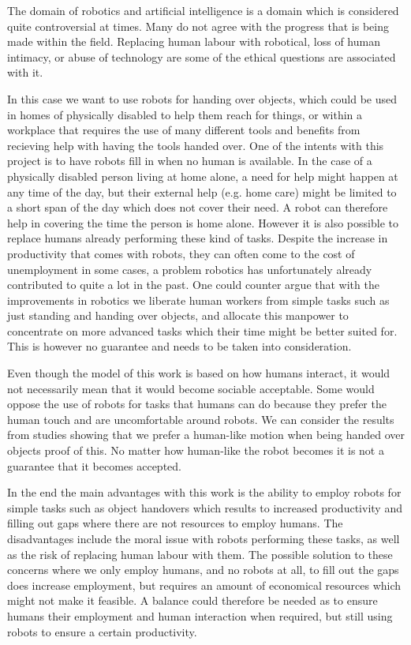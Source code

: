 The domain of robotics and artificial intelligence is a domain which is considered quite controversial at times. Many do not agree with the progress that is being made within the field. Replacing human labour with robotical, loss of human intimacy, or abuse of technology are some of the ethical questions are associated with it.

In this case we want to use robots for handing over objects, which could be used in homes of physically disabled to help them reach for things, or within a workplace that requires the use of many different tools and benefits from recieving help with having the tools handed over. One of the intents with this project is to have robots fill in when no human is available. In the case of a physically disabled person living at home alone, a need for help might happen at any time of the day, but their external help (e.g. home care) might be limited to a short span of the day which does not cover their need. A robot can therefore help in covering the time the person is home alone. However it is also possible to replace humans already performing these kind of tasks. Despite the increase in productivity that comes with robots, they can often come to the cost of unemployment in some cases, a problem robotics has unfortunately already contributed to quite a lot in the past. One could counter argue that with the improvements in robotics we liberate human workers from simple tasks such as just standing and handing over objects, and allocate this manpower to concentrate on more advanced tasks which their time might be better suited for. This is however no guarantee and needs to be taken into consideration.

Even though the model of this work is based on how humans interact, it would not necessarily mean that it would become sociable acceptable. Some would oppose the use of robots for tasks that humans can do because they prefer the human touch and are uncomfortable around robots. We can consider the results from studies showing that we prefer a human-like motion when being handed over objects proof of this. No matter how human-like the robot becomes it is not a guarantee that it becomes accepted.

In the end the main advantages with this work is the ability to employ robots for simple tasks such as object handovers which results to increased productivity and filling out gaps where there are not resources to employ humans. The disadvantages include the moral issue with robots performing these tasks, as well as the risk of replacing human labour with them. The possible solution to these concerns where we only employ humans, and no robots at all, to fill out the gaps does increase employment, but requires an amount of economical resources which might not make it feasible. A balance could therefore be needed as to ensure humans their employment and human interaction when required, but still using robots to ensure a certain productivity.



